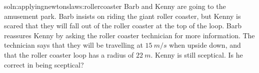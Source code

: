 
\begin{problem}{soln:applyingnewtonslaws:rollercoaster}{\label{prob:applyingnewtonslaws:rollercoaster} Barb and Kenny are going to the amusement park. Barb insists on riding the giant roller coaster, but Kenny is scared that they will fall out of the roller coaster at the top of the loop. Barb reassures Kenny by asking the roller coaster technician for more information. The technician says that they will be travelling at $\SI{15}{m/s}$ when upside down, and that the roller coaster loop has a radius of $\SI{22}{m}$. Kenny is still sceptical. Is he correct in being sceptical?}
\end{problem}

\newpage

